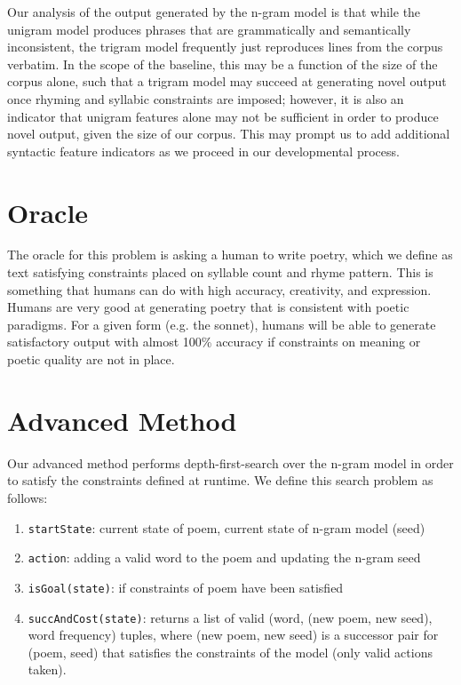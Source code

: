 \documentclass[10pt,twocolumn]{article}
\begin{document}
Our analysis of the output generated by the n-gram model is that while the unigram model produces phrases that are grammatically and semantically inconsistent, the trigram model frequently just reproduces lines from the corpus verbatim. In the scope of the baseline, this may be a function of the size of the corpus alone, such that a trigram model may succeed at generating novel output once rhyming and syllabic constraints are imposed; however, it is also an indicator that unigram features alone may not be sufficient in order to produce novel output, given the size of our corpus. This may prompt us to add additional syntactic feature indicators as we proceed in our developmental process.

\section{Oracle}
The oracle for this problem is asking a human to write poetry, which we define as text satisfying constraints placed on syllable count and rhyme pattern. This is something that humans can do with high accuracy, creativity, and expression. Humans are very good at generating poetry that is consistent with poetic paradigms. For a given form (e.g. the sonnet), humans will be able to generate satisfactory output with almost 100\% accuracy if constraints on meaning or poetic quality are not in place. 

\section{Advanced Method}
Our advanced method performs depth-first-search over the n-gram model in order to satisfy the constraints defined at runtime. We define this search problem as follows:
\begin{enumerate}
	\item \verb!startState!: current state of poem, current state of n-gram model (seed)
	\item \verb!action!: adding a valid word to the poem and updating the n-gram seed
	\item \verb!isGoal(state)!: if constraints of poem have been satisfied
	\item \verb!succAndCost(state)!: returns a list of valid (word, (new poem, new seed), word frequency) tuples, where (new poem, new seed) is a successor pair for (poem, seed) that satisfies the constraints of the model (only valid actions taken). 
	\end{enumerate}
	
\end{document}
